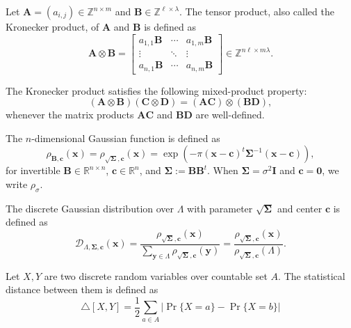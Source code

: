 \begin{definition}
Let $\mathbf{A} = (a_{i,j}) \in \mathbb{Z}^{n \times m}$ and $\mathbf{B} \in \mathbb{Z}^{\ell \times \lambda}$. The tensor product, also called the Kronecker product, of $\mathbf{A}$ and $\mathbf{B}$ is defined as
\[
\mathbf{A} \otimes \mathbf{B}
=
\begin{bmatrix}
a_{1,1}\mathbf{B} & \cdots & a_{1,m}\mathbf{B} \\
\vdots & \ddots & \vdots \\
a_{n,1}\mathbf{B} & \cdots & a_{n,m}\mathbf{B}
\end{bmatrix}
\in \mathbb{Z}^{n\ell \times m\lambda}.
\]
\end{definition}

The Kronecker product satisfies the following mixed-product property:
\[
(\mathbf{A} \otimes \mathbf{B})(\mathbf{C} \otimes \mathbf{D})
=
(\mathbf{A}\mathbf{C}) \otimes (\mathbf{B}\mathbf{D}),
\]
whenever the matrix products $\mathbf{A}\mathbf{C}$ and $\mathbf{B}\mathbf{D}$ are well-defined.

\begin{definition}
The $n$-dimensional Gaussian function is defined as
\[
\rho_{\mathbf{B},\mathbf{c}}(\mathbf{x})
=
\rho_{\sqrt{\mathbf{\Sigma}},\mathbf{c}}(\mathbf{x})
=
\exp\!\left(
-\pi (\mathbf{x}-\mathbf{c})^t \mathbf{\Sigma}^{-1} (\mathbf{x}-\mathbf{c})
\right),
\]
for invertible $\mathbf{B}\in\mathbb{R}^{n\times n}$, $\mathbf{c}\in\mathbb{R}^n$, and
$\mathbf{\Sigma}:=\mathbf{B}\mathbf{B}^t$.
When $\mathbf{\Sigma}=\sigma^2\mathbf{I}$ and $\mathbf{c}=\mathbf{0}$, we write $\rho_\sigma$.
\end{definition}

\begin{definition}
The discrete Gaussian distribution over $\Lambda$ with parameter $\sqrt{\mathbf{\Sigma}}$ and center $\mathbf{c}$ is defined as
\[
\mathcal{D}_{\Lambda,\mathbf{\Sigma},\mathbf{c}}(\mathbf{x})
=
\frac{\rho_{\sqrt{\mathbf{\Sigma}},\mathbf{c}}(\mathbf{x})}
{\sum_{\mathbf{y}\in\Lambda}\rho_{\sqrt{\mathbf{\Sigma}},\mathbf{c}}(\mathbf{y})}
=
\frac{\rho_{\sqrt{\mathbf{\Sigma}},\mathbf{c}}(\mathbf{x})}
{\rho_{\sqrt{\mathbf{\Sigma}},\mathbf{c}}(\Lambda)}.
\]
\end{definition}

\begin{definition}
    Let $X, Y$ are two discrete random variables over countable set $A$. The statistical distance between them is defined as 
    $$
    \triangle[X,Y] = \dfrac{1}{2}\sum_{a \in A}|\Pr\{X=a\}-\Pr\{X=b\}|
    $$
\end{definition}



